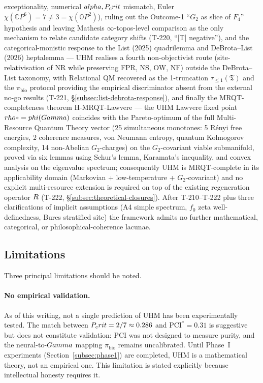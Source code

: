 \begin{enumerate}[leftmargin=2em]
        exceptionality, numerical $alpha, P_crit$ mismatch, Euler
        $\chi(\mathbb C P^6)=7 \neq 3 = \chi(\mathbb O P^2)$), ruling
        out the Outcome-1 ``$G_2$ as slice of $F_4$'' hypothesis and
        leaving Mathesis $\infty$-topos-level comparison as the only
        mechanism to relate candidate category shifts
        (T-220, ``[T] negative''), and the categorical-monistic
        response to the List (2025) quadrilemma and DeBrota--List
        (2026) heptalemma --- UHM realises a fourth non-objectivist
        route (site-relativisation of NR while preserving FPR, NS,
        OW, NF) outside the DeBrota--List taxonomy, with Relational
        QM recovered as the 1-truncation $\tau_{\leq 1}(\mathfrak T)$
        and the $\pi_{\mathrm{bio}}$ protocol providing the
        empirical discriminator absent from the external no-go
        results (T-221, \S\ref{subsec:list-debrota-response}), and
        finally the MRQT-completeness theorem H-MRQT-Lawvere ---
        the UHM Lawvere fixed point $rho* = phi(Gamma)$ coincides
        with the Pareto-optimum of the full Multi-Resource Quantum
        Theory vector (25 simultaneous monotones: 5 R\'enyi free
        energies, 2 coherence measures, von Neumann entropy,
        quantum Kolmogorov complexity, 14 non-Abelian
        $G_2$-charges) on the $G_2$-covariant viable submanifold,
        proved via six lemmas using Schur's lemma, Karamata's
        inequality, and convex analysis on the eigenvalue
        spectrum; consequently UHM is MRQT-complete in its
        applicability domain (Markovian + low-temperature +
        $G_2$-covariant) and no explicit multi-resource extension
        is required on top of the existing regeneration operator
        $R$ (T-222, \S\ref{subsec:theoretical-closures}).
        After T-210--T-222 plus three clarifications of implicit
        assumptions (A4 simple spectrum, $f_0$ zeta well-definedness,
        Bures stratified site) the framework admits no further
        mathematical, categorical, or philosophical-coherence
        lacunae.
\end{enumerate}

\subsection{Limitations}

Three principal limitations should be noted.

\paragraph{No empirical validation.}
As of this writing, not a single prediction of UHM has been experimentally
tested. The match between $P_crit = 2/7 \approx 0.286$ and
$\mathrm{PCI}^* = 0.31$ is suggestive but does not constitute validation:
PCI was not designed to measure purity, and the neural-to-$Gamma$ mapping
$\pi_{\mathrm{bio}}$ remains uncalibrated. Until Phase~I experiments
(Section~\ref{subsec:phase1}) are completed, UHM is a mathematical theory,
not an empirical one. This limitation is stated explicitly because
intellectual honesty requires it.

